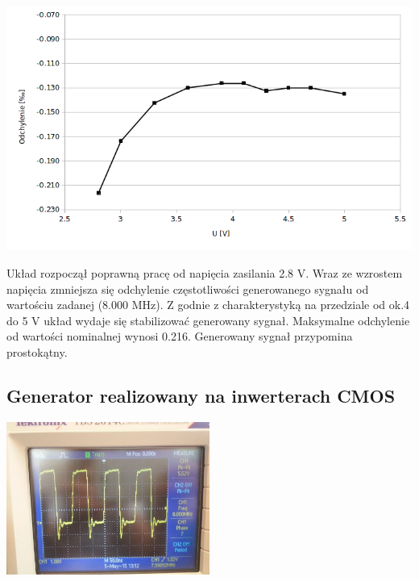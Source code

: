 \documentclass[a4paper,12pt]{article}
\begin{document}
\begin{center}
  \includegraphics[width=1\textwidth]{z1}
\end{center}
Układ rozpoczął poprawną pracę od napięcia zasilania 2.8 V. Wraz ze wzrostem napięcia zmniejsza się odchylenie częstotliwości generowanego sygnału od wartościu zadanej (8.000 MHz). Z godnie z charakterystyką na przedziale od ok.4 do 5 V układ wydaje się stabilizować generowany sygnał. Maksymalne odchylenie od wartości nominalnej wynosi 0.216\permil. Generowany sygnał przypomina prostokątny.

\pagebreak
\subsection{Generator realizowany na inwerterach CMOS }
\begin{center}
  \center
  \includegraphics[width=0.5\textwidth]{o2}
\end{center}
\end{document}
